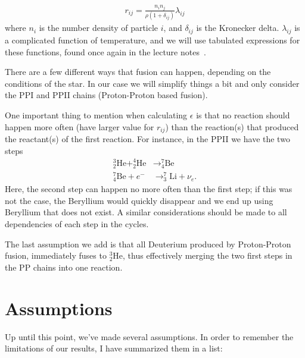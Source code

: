 \documentclass[11pt,twocolumn]{article}
\begin{document}
\begin{align}
  r_{ij} = \frac{n_in_j}{\rho(1+\delta_{ij})}\lambda_{ij}
\end{align}
where $n_i$ is the number density of particle $i$, and $\delta_{ij}$
is the Kronecker delta. $\lambda_{ij}$ is a complicated function of
temperature, and we will use tabulated expressions for these
functions, found once again in the lecture notes~\cite[Table
3.1]{lecture-notes}.


There are a few different ways that fusion can happen, depending
on the conditions of the star. In our case we will simplify things a
bit and only consider the PPI and PPII chains (Proton-Proton based
fusion). 

One important thing to mention when calculating $\epsilon$ is that no
reaction should happen more often (have larger value for $r_{ij}$)
than the reaction(s) that produced the reactant(s) of the first
reaction. For instance, in the PPII we have the two steps
\begin{align}
  ^3_2\text{He} + ^4_2\text{He}&\rightarrow ^7_4\text{Be}\\
  ^7_4\text{Be} + e^-&\rightarrow ^7_3\text{Li} + \nu_e.
\end{align}
Here, the second step can happen no more often than the first step; if
this was not the case, the Beryllium would quickly disappear and we
end up using Beryllium that does not exist. A similar considerations
should be made to all dependencies of each step in the cycles.


The last assumption we add is that all Deuterium produced by
Proton-Proton fusion, immediately fuses to $^3_2\text{He}$, thus
effectively merging the two first steps in the PP chains into one
reaction.


\section{Assumptions}
Up until this point, we've made several assumptions. In order to
remember the limitations of our results, I have summarized them in a
list:
\end{document}

